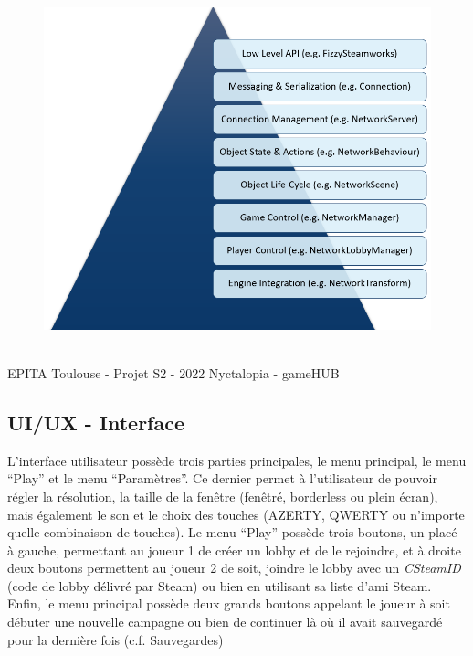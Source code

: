 \begin{figure}[H]
\centering
\begin{minipage}{.5\textwidth}
  \centering
  \centerline{\includegraphics[width=1.5\linewidth]{img/HLAPI.png}}
  \label{fig:hlapistructure}
\end{minipage}%
\end{figure}

\vfill
\noindent\makebox[\linewidth]{\rule{.8\paperwidth}{.6pt}}\\[0.2cm]
EPITA Toulouse - Projet S2 - 2022 \hfill Nyctalopia - gameHUB
\noindent\makebox[\linewidth]{\rule{.8\paperwidth}{.6pt}}

\newpage

\subsection{UI/UX - Interface}
\setlength{\parindent}{5ex}
L'interface utilisateur possède trois parties principales, le menu principal, le menu ``Play'' et le menu ``Paramètres''. Ce dernier permet à l'utilisateur de pouvoir régler la résolution, la taille de la fenêtre (fenêtré, borderless ou plein écran), mais également le son et le choix des touches (AZERTY, QWERTY ou n'importe quelle combinaison de touches).
Le menu ``Play'' possède trois boutons, un placé à gauche, permettant au joueur 1 de créer un lobby et de le rejoindre, et à droite deux boutons permettent au joueur 2 de soit, joindre le lobby avec un \emph{CSteamID} (code de lobby délivré par Steam) ou bien en utilisant sa liste d'ami Steam.
Enfin, le menu principal possède deux grands boutons appelant le joueur à soit débuter une nouvelle campagne ou bien de continuer là où il avait sauvegardé pour la dernière fois (c.f. Sauvegardes)

